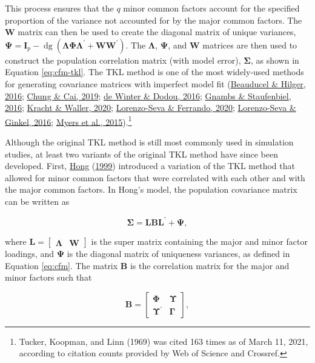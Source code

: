 \documentclass[11pt]{umnthesis}
\DeclareMathOperator{\dg}{\textrm{dg}}
\begin{document}
\noindent This process ensures that the \(q\) minor common factors account for the specified proportion of the variance not accounted for by the major common factors. The \(\mathbf{W}\) matrix can then be used to create the diagonal matrix of unique variances, \(\bm{\Psi} = \mathbf{I}_p - \dg(\bm{\Lambda} \bm{\Phi}\bm{\Lambda}^\prime + \mathbf{WW}^\prime)\). The \(\bm{\Lambda}\), \(\bm{\Psi}\), and \(\mathbf{W}\) matrices are then used to construct the population correlation matrix (with model error), \(\bm{\Sigma}\), as shown in Equation \eqref{eq:cfm-tkl}. The TKL method is one of the most widely-used methods for generating covariance matrices with imperfect model fit (\protect\hyperlink{ref-beauducel2016}{Beauducel \& Hilger, 2016}; \protect\hyperlink{ref-chung2019}{Chung \& Cai, 2019}; \protect\hyperlink{ref-dewinter2016}{de Winter \& Dodou, 2016}; \protect\hyperlink{ref-gnambs2016}{Gnambs \& Staufenbiel, 2016}; \protect\hyperlink{ref-kracht2020}{Kracht \& Waller, 2020}; \protect\hyperlink{ref-lorenzo-seva2020}{Lorenzo-Seva \& Ferrando, 2020}; \protect\hyperlink{ref-lorenzo-seva2016}{Lorenzo-Seva \& Ginkel, 2016}; \protect\hyperlink{ref-myers2015a}{Myers et al., 2015}).\footnote{Tucker, Koopman, and Linn (1969) was cited 163 times as of March 11, 2021, according to citation counts provided by Web of Science and Crossref.}

Although the original TKL method is still most commonly used in simulation studies, at least two variants of the original TKL method have since been developed. First, \protect\hyperlink{ref-hong1999}{Hong} (\protect\hyperlink{ref-hong1999}{1999}) introduced a variation of the TKL method that allowed for minor common factors that were correlated with each other and with the major common factors. In Hong's model, the population covariance matrix can be written as

\begin{equation}
\bm{\Sigma} = \mathbf{L} \mathbf{B} \mathbf{L}^\prime + \bm{\Psi},
\end{equation}

\noindent where \(\mathbf{L} = \begin{bmatrix} \bm{\Lambda} & \mathbf{W} \end{bmatrix}\) is the super matrix containing the major and minor factor loadings, and \(\bm{\Psi}\) is the diagonal matrix of uniqueness variances, as defined in Equation \eqref{eq:cfm}. The matrix \(\mathbf{B}\) is the correlation matrix for the major and minor factors such that

\begin{equation}
\mathbf{B} = \begin{bmatrix} \bm{\Phi} & \bm{\Upsilon} \\ \bm{\Upsilon}^\prime & \bm{\Gamma} \end{bmatrix},
\end{equation}
\end{document}
